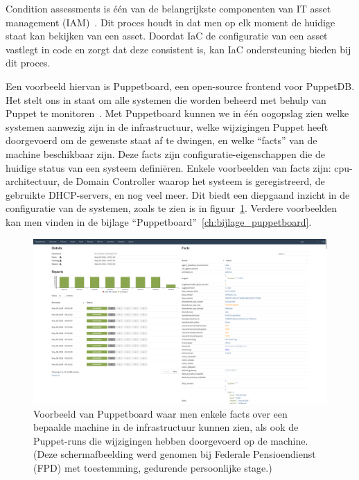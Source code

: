Condition assessments is \'e\'en van de belangrijkste componenten van IT asset management (IAM)~\autocite{ibm-what-is-iam}.
Dit proces houdt in dat men op elk moment de huidige staat kan bekijken van een asset.
Doordat IaC de configuratie van een asset vastlegt in code en zorgt dat deze consistent is, kan IaC ondersteuning bieden bij dit proces.

Een voorbeeld hiervan is Puppetboard, een open-source frontend voor PuppetDB.
Het stelt ons in staat om alle systemen die worden beheerd met behulp van Puppet te monitoren~\autocite{puppetboard-github}.
Met Puppetboard kunnen we in \'e\'en oogopslag zien welke systemen aanwezig zijn in de infrastructuur, welke wijzigingen Puppet heeft doorgevoerd om de gewenste staat af te dwingen, en welke ``facts'' van de machine beschikbaar zijn.
Deze facts zijn configuratie-eigenschappen die de huidige status van een systeem defini\"eren.
Enkele voorbeelden van facts zijn: cpu-architectuur, de Domain Controller waarop het systeem is geregistreerd, de gebruikte DHCP-servers, en nog veel meer.
Dit biedt een diepgaand inzicht in de configuratie van de systemen, zoals te zien is in figuur~\ref{fig:puppetboard-host-details}.
Verdere voorbeelden kan men vinden in de bijlage ``Puppetboard''~\ref{ch:bijlage_puppetboard}.

\begin{figure}[h!]
    \includegraphics[width=\textwidth]
    {./graphics/state-of-the-art/puppetboard/puppetboard-host-details.png}
    \caption[Puppetboard host details.]{\label{fig:puppetboard-host-details}Voorbeeld van Puppetboard waar men enkele facts over een bepaalde machine in de infrastructuur kunnen zien, als ook de Puppet-runs die wijzigingen hebben doorgevoerd op de machine. (Deze schermafbeelding werd genomen bij Federale Pensioendienst (FPD) met toestemming, gedurende persoonlijke stage.)}
\end{figure}

